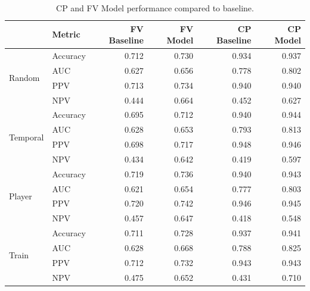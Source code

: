 \documentclass[11pt]{article}
\begin{document}
\begin{table}
\centering
\caption{CP and FV Model performance compared to baseline.}
\label{tab:cp-fv-performance}
\begin{tabular}{llrrrr}
\toprule
 & Metric & FV Baseline & FV Model & CP Baseline & CP Model \\
\midrule
\multirow{4}{*}{Random} & Accuracy & 0.712 & 0.730 & 0.934 & 0.937 \\
 & AUC & 0.627 & 0.656 & 0.778 & 0.802 \\
 & PPV & 0.713 & 0.734 & 0.940 & 0.940 \\
 & NPV & 0.444 & 0.664 & 0.452 & 0.627 \\
\midrule
\multirow{4}{*}{Temporal} & Accuracy & 0.695 & 0.712 & 0.940 & 0.944 \\
 & AUC & 0.628 & 0.653 & 0.793 & 0.813 \\
 & PPV & 0.698 & 0.717 & 0.948 & 0.946 \\
 & NPV & 0.434 & 0.642 & 0.419 & 0.597 \\
\midrule
\multirow{4}{*}{Player} & Accuracy & 0.719 & 0.736 & 0.940 & 0.943 \\
 & AUC & 0.621 & 0.654 & 0.777 & 0.803 \\
 & PPV & 0.720 & 0.742 & 0.946 & 0.945 \\
 & NPV & 0.457 & 0.647 & 0.418 & 0.548 \\
\midrule
\multirow{4}{*}{Train} & Accuracy & 0.711 & 0.728 & 0.937 & 0.941 \\
 & AUC & 0.628 & 0.668 & 0.788 & 0.825 \\
 & PPV & 0.712 & 0.732 & 0.943 & 0.943 \\
 & NPV & 0.475 & 0.652 & 0.431 & 0.710 \\
\bottomrule
\end{tabular}
\end{table}
\end{document}
